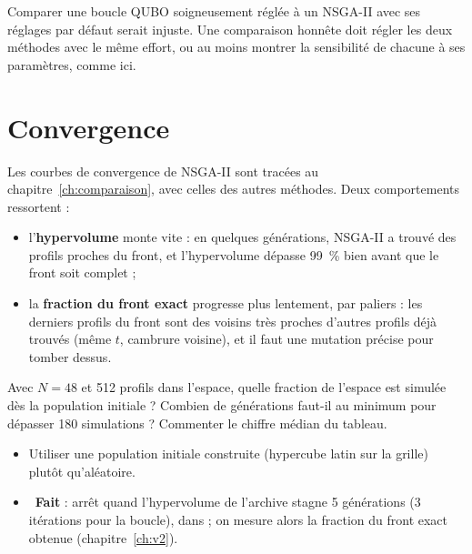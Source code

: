 \begin{piege}
Comparer une boucle QUBO soigneusement réglée à un NSGA-II avec ses réglages par défaut serait injuste. Une comparaison honnête doit régler les deux méthodes avec le même effort, ou au moins montrer la sensibilité de chacune à ses paramètres, comme ici.
\end{piege}

\section{Convergence}
Les courbes de convergence de NSGA-II sont tracées au chapitre~\ref{ch:comparaison}, avec celles des autres méthodes. Deux comportements ressortent :
\begin{itemize}
\item l'\textbf{hypervolume} monte vite : en quelques générations, NSGA-II a trouvé des profils proches du front, et l'hypervolume dépasse 99~\% bien avant que le front soit complet ;
\item la \textbf{fraction du front exact} progresse plus lentement, par paliers : les derniers profils du front sont des voisins très proches d'autres profils déjà trouvés (même $t$, cambrure voisine), et il faut une mutation précise pour tomber dessus.
\end{itemize}

\exercices
\begin{exercice}
Avec $N=48$ et 512 profils dans l'espace, quelle fraction de l'espace est simulée dès la population initiale ? Combien de générations faut-il au minimum pour dépasser 180 simulations ? Commenter le chiffre médian du tableau.
\end{exercice}

\begin{pistes}
\begin{itemize}
\item Utiliser une population initiale construite (hypercube latin sur la grille) plutôt qu'aléatoire.
\item {}~\textbf{Fait} : arrêt quand l'hypervolume de l'archive stagne 5 générations (3 itérations pour la boucle), dans  ; on mesure alors la fraction du front exact obtenue (chapitre~\ref{ch:v2}).
\end{itemize}
\end{pistes}
